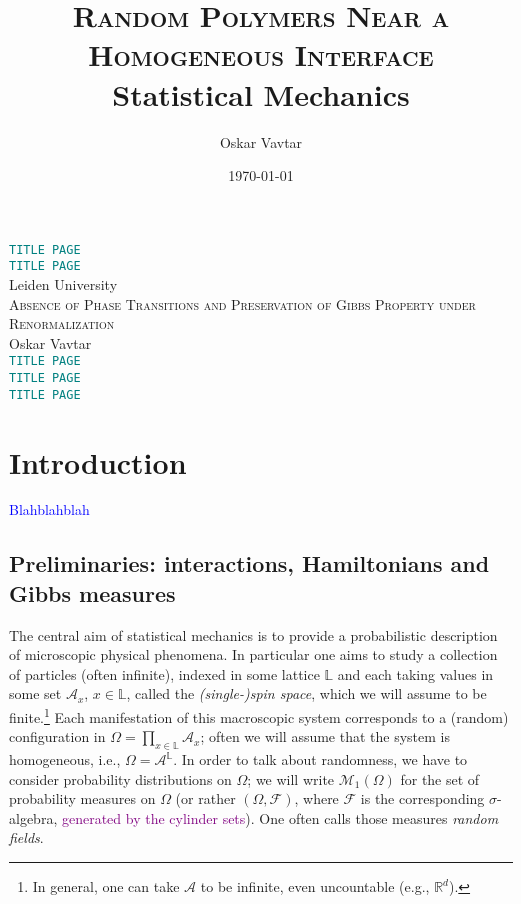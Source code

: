 \documentclass[12pt]{article}
\title{\textsc{Random Polymers Near a Homogeneous Interface}\\\vspace{0.3cm}\small{Statistical Mechanics}\vspace{-0.7cm}}
\author{Oskar Vavtar}
\date{\today}
\newcommand{\A}{\mathcal{A}}
\newcommand{\F}{\mathcal{F}}
\renewcommand{\L}{\mathbb{L}}
\newcommand{\M}{\mathcal{M}}
\newcommand{\R}{\mathbb{R}}
\newcommand{\1}{\mathbbm{1}}
\newcommand{\5}{\vspace{0.5cm}}
\theoremstyle{definition}
\begin{document}
\begin{center}
\Huge{\textcolor{teal}{\texttt{TITLE PAGE}}} \\
\vspace{2cm}
\Huge{\textcolor{teal}{\texttt{TITLE PAGE}}} \\
\vspace{2cm}
Leiden University \\
\vspace{2cm}
{\textsc{Absence of Phase Transitions and Preservation of Gibbs Property under Renormalization}} \\
\vspace{2cm}
Oskar Vavtar \\
\vspace{2cm}
\Huge{\textcolor{teal}{\texttt{TITLE PAGE}}} \\
\vspace{2cm}
\Huge{\textcolor{teal}{\texttt{TITLE PAGE}}} \\
\vspace{2cm}
\Huge{\textcolor{teal}{\texttt{TITLE PAGE}}}
\end{center}
\pagebreak
\tableofcontents
\pagebreak


\section{Introduction}

\textcolor{blue}{Blahblahblah}


\subsection{Preliminaries: interactions, Hamiltonians and Gibbs measures}

The central aim of statistical mechanics is to provide a probabilistic description of microscopic physical phenomena. In particular one aims to study a collection of particles (often infinite), indexed in some lattice $\L$ and each taking values in some set $\A_x$, $x\in\L$, called the \textit{(single-)spin space}, which we will assume to be finite.\footnote{In general, one can take $\A$ to be infinite, even uncountable (e.g., $\R^d$).} Each manifestation of this macroscopic system corresponds to a (random) configuration in $\Omega=\prod_{x\in\L}\A_x$; often we will assume that the system is homogeneous, i.e., $\Omega=\A^{\L}$. In order to talk about randomness, we have to consider probability distributions on $\Omega$; we will write $\M_1(\Omega)$ for the set of probability measures on $\Omega$ (or rather $(\Omega,\F)$, where $\F$ is the  corresponding $\sigma$-algebra, \textcolor{purple}{generated by the cylinder sets}). One often calls those measures \textit{random fields}. \\
\end{document}
